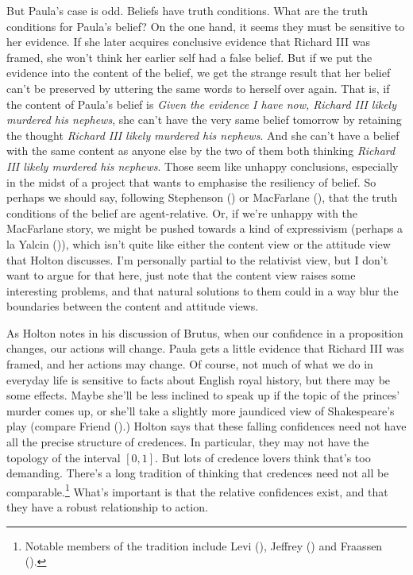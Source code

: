\documentclass[
  10pt,
  letterpaper,
  DIV=11,
  numbers=noendperiod,
  twoside]{scrartcl}
\begin{document}
But Paula's case is odd. Beliefs have truth conditions. What are the
truth conditions for Paula's belief? On the one hand, it seems they must
be sensitive to her evidence. If she later acquires conclusive evidence
that Richard III was framed, she won't think her earlier self had a
false belief. But if we put the evidence into the content of the belief,
we get the strange result that her belief can't be preserved by uttering
the same words to herself over again. That is, if the content of Paula's
belief is \emph{Given the evidence I have now, Richard III likely
murdered his nephews}, she can't have the very same belief tomorrow by
retaining the thought \emph{Richard III likely murdered his nephews}.
And she can't have a belief with the same content as anyone else by the
two of them both thinking \emph{Richard III likely murdered his
nephews}. Those seem like unhappy conclusions, especially in the midst
of a project that wants to emphasise the resiliency of belief. So
perhaps we should say, following Stephenson
() or MacFarlane
(), that the truth conditions of the
belief are agent-relative. Or, if we're unhappy with the MacFarlane
story, we might be pushed towards a kind of expressivism (perhaps a la
Yalcin ()), which isn't quite like either
the content view or the attitude view that Holton discusses. I'm
personally partial to the relativist view, but I don't want to argue for
that here, just note that the content view raises some interesting
problems, and that natural solutions to them could in a way blur the
boundaries between the content and attitude views.

As Holton notes in his discussion of Brutus, when our confidence in a
proposition changes, our actions will change. Paula gets a little
evidence that Richard III was framed, and her actions may change. Of
course, not much of what we do in everyday life is sensitive to facts
about English royal history, but there may be some effects. Maybe she'll
be less inclined to speak up if the topic of the princes' murder comes
up, or she'll take a slightly more jaundiced view of Shakespeare's play
(compare Friend ().) Holton says that
these falling confidences need not have all the precise structure of
credences. In particular, they may not have the topology of the interval
\([0, 1]\). But lots of credence lovers think that's too demanding.
There's a long tradition of thinking that credences need not all be
comparable.\footnote{Notable members of the tradition include Levi
  (), Jeffrey
  () and Fraassen
  ().} What's important is that the
relative confidences exist, and that they have a robust relationship to
action.
\end{document}
